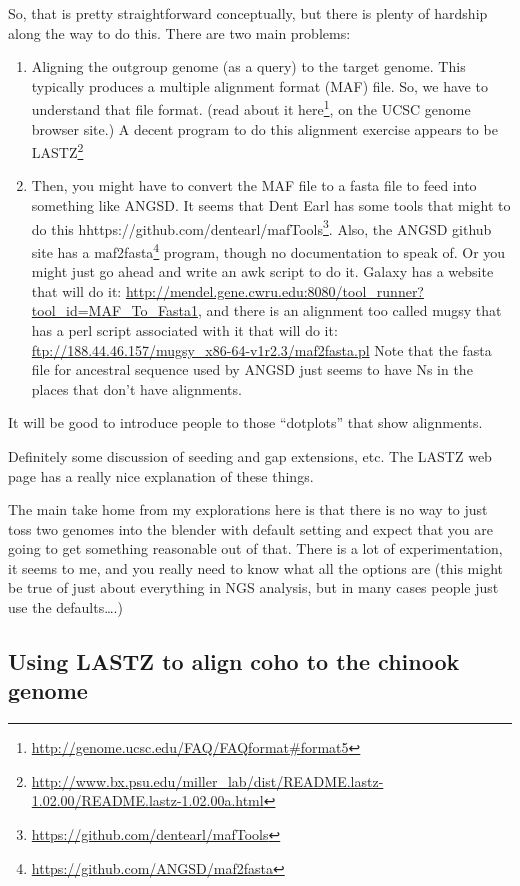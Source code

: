 \documentclass[]{krantz}
\renewcommand{\href}[2]{#2\footnote{\url{#1}}}
\begin{document}
So, that is pretty straightforward conceptually, but there is plenty of hardship
along the way to do this. There are two main problems:

\begin{enumerate}
\def\labelenumi{\arabic{enumi}.}
\item
  Aligning the outgroup genome (as a query) to the target genome. This typically
  produces a multiple alignment format (MAF) file. So, we have to understand that
  file format. (read about it \href{http://genome.ucsc.edu/FAQ/FAQformat\#format5}{here}, on the
  UCSC genome browser site.) A decent program to do this alignment exercise appears to
  be \href{http://www.bx.psu.edu/miller_lab/dist/README.lastz-1.02.00/README.lastz-1.02.00a.html}{LASTZ}
\item
  Then, you might have to convert the MAF file to a fasta file to feed into something
  like ANGSD. It seems that Dent Earl has some tools that might to do this \href{https://github.com/dentearl/mafTools}{hhttps://github.com/dentearl/mafTools}. Also, the ANGSD github site has a \href{https://github.com/ANGSD/maf2fasta}{maf2fasta} program, though no
  documentation to speak of. Or you might just go ahead and write an awk script to do it.
  Galaxy has a website that will do it: \url{http://mendel.gene.cwru.edu:8080/tool_runner?tool_id=MAF_To_Fasta1}, and there is an alignment too called mugsy
  that has a perl script associated with it that will do it: \url{ftp://188.44.46.157/mugsy_x86-64-v1r2.3/maf2fasta.pl}
  Note that the fasta file for ancestral sequence used by ANGSD just seems to have Ns in the places that don't have alignments.
\end{enumerate}

It will be good to introduce people to those ``dotplots'' that show alignments.

Definitely some discussion of seeding and gap extensions, etc. The LASTZ web page has a
really nice explanation of these things.

The main take home from my explorations here is that there is no way to just toss two
genomes into the blender with default setting and expect that you are going to get
something reasonable out of that. There is a lot of experimentation, it seems to me, and
you really need to know what all the options are (this might be true of just about
everything in NGS analysis, but in many cases people just use the defaults\ldots{}.)

\hypertarget{using-lastz-to-align-coho-to-the-chinook-genome}{%
\subsection{Using LASTZ to align coho to the chinook genome}\label{using-lastz-to-align-coho-to-the-chinook-genome}}
\end{document}
